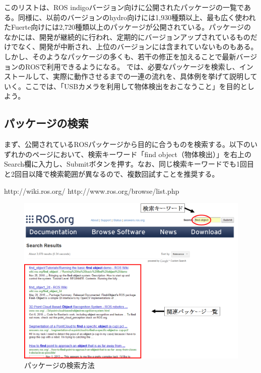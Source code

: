 このリストは、ROS indigoバージョン向けに公開されたパッケージの一覧である。同様に、以前のバージョンのhydro向けには1,930種類以上、最も広く使われたFuerte向けには2,720種類以上のパッケージが公開されている。パッケージのなかには、開発が継続的に行われ、定期的にバージョンアップされているものだけでなく、開発が中断され、上位のバージョンには含まれていないものもある。しかし、そのようなパッケージの多くも、若干の修正を加えることで最新バージョンのROSで利用できるようになる。
では、必要なパッケージを検索し、インストールして、実際に動作させるまでの一連の流れを、具体例を挙げて説明していく。ここでは、「USBカメラを利用して物体検出をおこなうこと」を目的としよう。

\subsection{パッケージの検索}

まず、公開されているROSパッケージから目的に合うものを検索する。以下のいずれかのページにおいて、検索キーワード「find object（物体検出）」を右上のSearch欄に入力し、Submitボタンを押す。なお、同じ検索キーワードでも1回目と2回目以降で検索範囲が異なるので、複数回試すことを推奨する。

http://wiki.ros.org/
http://www.ros.org/browse/list.php

\begin{figure}[htp]
  \centering
  \includegraphics[width=\columnwidth]{pictures/chapter7/pic_07_05.png}
  \caption{パッケージの検索方法}
\end{figure}

